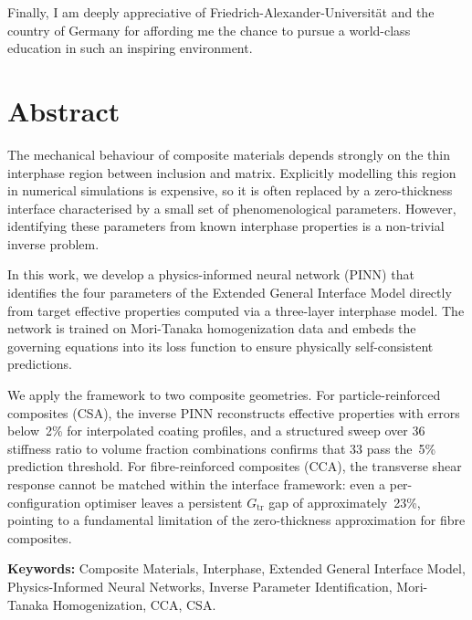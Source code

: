 \documentclass[oneside, 12pt, a4paper, bibliography=totoc]{book}
\begin{document}
Finally, I am deeply appreciative of Friedrich-Alexander-Universität and the country of Germany for affording me the chance to pursue a world-class education in such an inspiring environment.

\chapter*{Abstract}

The mechanical behaviour of composite materials depends strongly on the thin interphase region between inclusion and matrix. Explicitly modelling this region in numerical simulations is expensive, so it is often replaced by a zero-thickness interface characterised by a small set of phenomenological parameters. However, identifying these parameters from known interphase properties is a non-trivial inverse problem.

In this work, we develop a physics-informed neural network (PINN) that identifies the four parameters of the Extended General Interface Model directly from target effective properties computed via a three-layer interphase model. The network is trained on Mori-Tanaka homogenization data and embeds the governing equations into its loss function to ensure physically self-consistent predictions.

We apply the framework to two composite geometries. For particle-reinforced composites (CSA), the inverse PINN reconstructs effective properties with errors below~2\% for interpolated coating profiles, and a structured sweep over 36 stiffness ratio to volume fraction combinations confirms that 33 pass the~5\% prediction threshold. For fibre-reinforced composites (CCA), the transverse shear response cannot be matched within the interface framework: even a per-configuration optimiser leaves a persistent $G_{\text{tr}}$ gap of approximately~23\%, pointing to a fundamental limitation of the zero-thickness approximation for fibre composites.

\vspace{1cm}
\noindent\textbf{Keywords:} Composite Materials, Interphase, Extended General Interface Model, Physics-Informed Neural Networks, Inverse Parameter Identification, Mori-Tanaka Homogenization, CCA, CSA.

\cleardoublepage
{}
\tableofcontents
\end{document}
